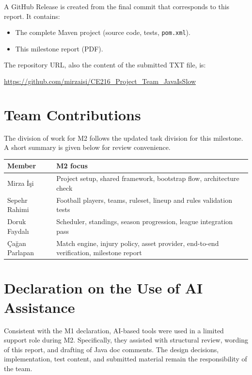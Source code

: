 \documentclass[11pt, a4paper]{article}
\newcommand{\code}[1]{\texttt{#1}}
\begin{document}
A GitHub Release is created from the final commit
that corresponds to this report. It contains:

\begin{itemize}
    \item The complete Maven project (source code, tests, \code{pom.xml}).
    \item This milestone report (PDF).
\end{itemize}

The repository URL, also the content of the submitted TXT file, is:

\begin{center}
    \url{https://github.com/mirzaisi/CE216_Project_Team_JavaIsSlow}
\end{center}

\section{Team Contributions}

The division of work for M2 follows the updated task division for this
milestone. A short summary is given below for review convenience.

\begin{longtable}{ll}
    \toprule
    \textbf{Member}  & \textbf{M2 focus} \\
    \midrule
    \endhead
    Mirza İşi         & Project setup, shared framework, bootstrap flow, architecture check \\
    Sepehr Rahimi     & Football players, teams, ruleset, lineup and rules validation tests \\
    Doruk Faydalı     & Scheduler, standings, season progression, league integration pass   \\
    Çağan Parlapan    & Match engine, injury policy, asset provider, end-to-end verification, milestone report \\
    \bottomrule
\end{longtable}

\section*{Declaration on the Use of AI Assistance}

Consistent with the M1 declaration, AI-based tools were used in a
limited support role during M2. Specifically, they assisted with
structural review, wording of this report, and drafting of Java doc
comments. The design decisions, implementation, test content, and
submitted material remain the responsibility of the team.
\end{document}
